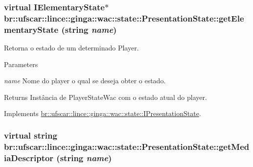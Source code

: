 \hypertarget{classbr_1_1ufscar_1_1lince_1_1ginga_1_1wac_1_1state_1_1PresentationState_a460f75f353ea3508dacdbd2a29bd537e}{
\subsubsection[{getElementaryState}]{\setlength{\rightskip}{0pt plus 5cm}virtual {\bf IElementaryState}$\ast$ br::ufscar::lince::ginga::wac::state::PresentationState::getElementaryState (string {\em name})}}
\label{classbr_1_1ufscar_1_1lince_1_1ginga_1_1wac_1_1state_1_1PresentationState_a460f75f353ea3508dacdbd2a29bd537e}


Retorna o estado de um determinado Player. 


\begin{DoxyParams}{Parameters}
\item[{\em name}]Nome do player o qual se deseja obter o estado. \end{DoxyParams}
\begin{DoxyReturn}{Returns}
Instância de PlayerStateWac com o estado atual do player. 
\end{DoxyReturn}


Implements \hyperlink{classbr_1_1ufscar_1_1lince_1_1ginga_1_1wac_1_1state_1_1IPresentationState_a42e36ac35404e13df2b3df4f2da614a1}{br::ufscar::lince::ginga::wac::state::IPresentationState}.

\hypertarget{classbr_1_1ufscar_1_1lince_1_1ginga_1_1wac_1_1state_1_1PresentationState_a5f3306aca36ba9aac7c43d27f6f29ad9}{
\subsubsection[{getMediaDescriptor}]{\setlength{\rightskip}{0pt plus 5cm}virtual string br::ufscar::lince::ginga::wac::state::PresentationState::getMediaDescriptor (string {\em name})}}
\label{classbr_1_1ufscar_1_1lince_1_1ginga_1_1wac_1_1state_1_1PresentationState_a5f3306aca36ba9aac7c43d27f6f29ad9}


